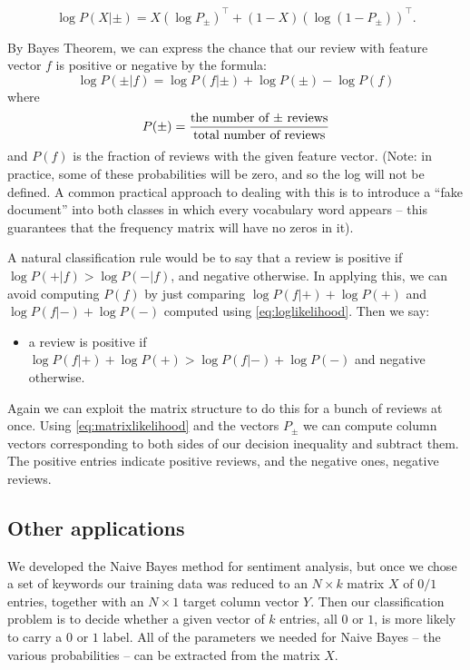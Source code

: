 \documentclass[
]{article}
\providecommand{\tightlist}{%
  \setlength{\itemsep}{0pt}\setlength{\parskip}{0pt}}
\begin{document}
\begin{equation}
\log P(X|\pm) = X(\log P_{\pm})^{\intercal}+(1-X)(\log (1-P_{\pm}))^{\intercal}.
\label{eq:matrixlikelihood}\end{equation}

By Bayes Theorem, we can express the chance that our review with feature
vector \(f\) is positive or negative by the formula: \[
\log P(\pm|f) = \log P(f|\pm)+\log P(\pm) - \log P(f)
\] where \[
P(\pm) = \frac{\hbox{\rm the number of $\pm$ reviews}}{\hbox{\rm total number of reviews}}
\] and \(P(f)\) is the fraction of reviews with the given feature
vector. (Note: in practice, some of these probabilities will be zero,
and so the log will not be defined. A common practical approach to
dealing with this is to introduce a ``fake document'' into both classes
in which every vocabulary word appears -- this guarantees that the
frequency matrix will have no zeros in it).

A natural classification rule would be to say that a review is positive
if \(\log P(+|f)>\log P(-|f)\), and negative otherwise. In applying
this, we can avoid computing \(P(f)\) by just comparing
\(\log P(f|+)+\log P(+)\) and \(\log P(f|-)+\log P(-)\) computed using
\cref{eq:loglikelihood}. Then we say:

\begin{itemize}
\tightlist
\item
  a review is positive if
  \(\log P(f|+)+\log P(+)>\log P(f|-)+\log P(-)\) and negative
  otherwise.
\end{itemize}

Again we can exploit the matrix structure to do this for a bunch of
reviews at once. Using \cref{eq:matrixlikelihood} and the vectors
\(P_{\pm}\) we can compute column vectors corresponding to both sides of
our decision inequality and subtract them. The positive entries indicate
positive reviews, and the negative ones, negative reviews.

\hypertarget{other-applications}{%
\subsection{Other applications}\label{other-applications}}

We developed the Naive Bayes method for sentiment analysis, but once we
chose a set of keywords our training data was reduced to an
\(N\times k\) matrix \(X\) of \(0/1\) entries, together with an
\(N\times 1\) target column vector \(Y\). Then our classification
problem is to decide whether a given vector of \(k\) entries, all \(0\)
or \(1\), is more likely to carry a \(0\) or \(1\) label. All of the
parameters we needed for Naive Bayes -- the various probabilities -- can
be extracted from the matrix \(X\).
\end{document}
